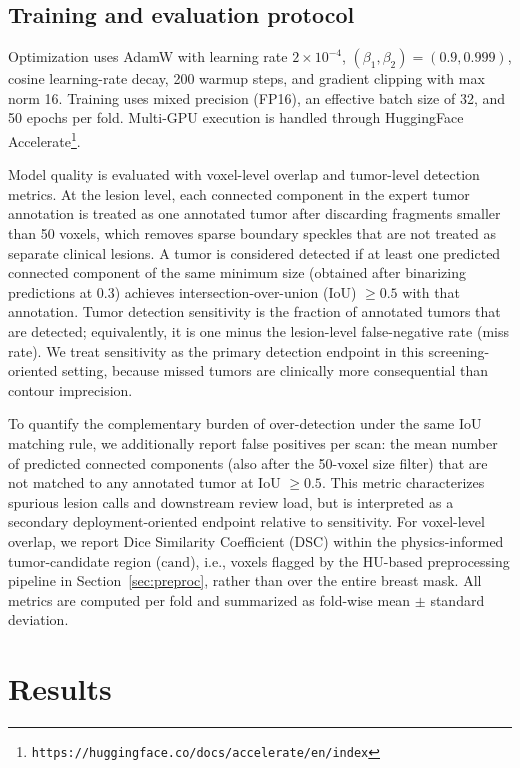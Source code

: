 \documentclass{iopjournal}
\begin{document}
\subsection{Training and evaluation protocol}\label{sec:eval}
Optimization uses AdamW with learning rate $2\times10^{-4}$, $(\beta_1,\beta_2)=(0.9,0.999)$, cosine learning-rate decay, 200 warmup steps, and gradient clipping with max norm 16. Training uses mixed precision (FP16), an effective batch size of 32, and 50 epochs per fold. Multi-GPU execution is handled through HuggingFace Accelerate\footnote{\texttt{https://huggingface.co/docs/accelerate/en/index}}.

Model quality is evaluated with voxel-level overlap and tumor-level detection metrics. At the lesion level, each connected component in the expert tumor annotation is treated as one annotated tumor after discarding fragments smaller than 50 voxels, which removes sparse boundary speckles that are not treated as separate clinical lesions. A tumor is considered detected if at least one predicted connected component of the same minimum size (obtained after binarizing predictions at 0.3) achieves intersection-over-union (IoU) $\ge 0.5$ with that annotation. Tumor detection sensitivity is the fraction of annotated tumors that are detected; equivalently, it is one minus the lesion-level false-negative rate (miss rate). We treat sensitivity as the primary detection endpoint in this screening-oriented setting, because missed tumors are clinically more consequential than contour imprecision.

To quantify the complementary burden of over-detection under the same IoU matching rule, we additionally report false positives per scan: the mean number of predicted connected components (also after the 50-voxel size filter) that are not matched to any annotated tumor at IoU $\ge 0.5$. This metric characterizes spurious lesion calls and downstream review load, but is interpreted as a secondary deployment-oriented endpoint relative to sensitivity. For voxel-level overlap, we report Dice Similarity Coefficient (DSC) within the physics-informed tumor-candidate region ($\mathrm{cand}$), i.e., voxels flagged by the HU-based preprocessing pipeline in Section~\ref{sec:preproc}, rather than over the entire breast mask. All metrics are computed per fold and summarized as fold-wise mean $\pm$ standard deviation.

\section{Results}
\end{document}
